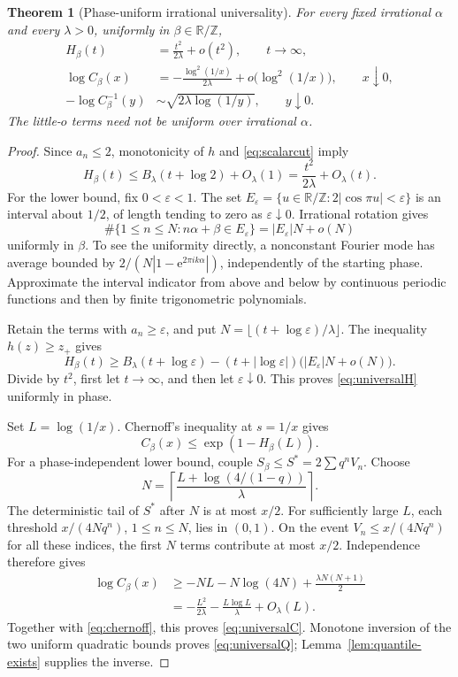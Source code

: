 \documentclass[11pt,a4paper]{article}
\newtheorem{theorem}{Theorem}[section]
\theoremstyle{definition}
\theoremstyle{remark}\newtheorem{remark}[theorem]{Remark}
\newcommand{\T}{\mathbb R/\mathbb Z}
\newcommand{\e}{\mathrm e}
\newcommand{\eps}{\varepsilon}
\begin{document}
\begin{theorem}[Phase-uniform irrational universality]
\label{thm:universal}
For every fixed irrational $\alpha$ and every $\lambda>0$, uniformly in
$\beta\in\T$,
\begin{align}
 H_\beta(t)&=\frac{t^2}{2\lambda}+o(t^2),\qquad t\to\infty,
 \label{eq:universalH}\\
 \log C_\beta(x)&=-\frac{\log^2(1/x)}{2\lambda}
                  +o\!\bigl(\log^2(1/x)\bigr),\qquad x\downarrow0,
 \label{eq:universalC}\\
 -\log C_\beta^{-1}(y)&\sim\sqrt{2\lambda\log(1/y)},\qquad y\downarrow0.
 \label{eq:universalQ}
\end{align}
The little-$o$ terms need not be uniform over irrational $\alpha$.
\end{theorem}
\begin{proof}
Since $a_n\le2$, monotonicity of $h$ and \eqref{eq:scalarcut} imply
\[
 H_\beta(t)\le B_\lambda(t+\log2)+O_\lambda(1)
             =\frac{t^2}{2\lambda}+O_\lambda(t).
\]
For the lower bound, fix $0<\eps<1$.  The set
$E_\eps=\{u\in\T:2|\cos\pi u|<\eps\}$ is an interval about $1/2$,
of length tending to zero as $\eps\downarrow0$.  Irrational rotation gives
\begin{equation}
 \#\{1\le n\le N:n\alpha+\beta\in E_\eps\}
 =|E_\eps|N+o(N)
 \label{eq:uniformequi}
\end{equation}
uniformly in $\beta$.  To see the uniformity directly, a nonconstant Fourier
mode has average bounded by
$2/(N|1-\e^{2\pi i k\alpha}|)$, independently of the starting phase.
Approximate the interval indicator from above and below by continuous
periodic functions and then by finite trigonometric polynomials.

Retain the terms with $a_n\ge\eps$, and put
$N=\lfloor(t+\log\eps)/\lambda\rfloor$.  The inequality $h(z)\ge z_+$
gives
\[
 H_\beta(t)\ge B_\lambda(t+\log\eps)
  -(t+|\log\eps|)\bigl(|E_\eps|N+o(N)\bigr).
\]
Divide by $t^2$, first let $t\to\infty$, and then let $\eps\downarrow0$.
This proves \eqref{eq:universalH} uniformly in phase.

Set $L=\log(1/x)$.  Chernoff's inequality at $s=1/x$ gives
\begin{equation}
 C_\beta(x)\le\exp(1-H_\beta(L)).
 \label{eq:chernoff}
\end{equation}
For a phase-independent lower bound, couple
$S_\beta\le S^*=2\sum q^nV_n$.  Choose
\[
 N=\left\lceil\frac{L+\log(4/(1-q))}{\lambda}\right\rceil.
\]
The deterministic tail of $S^*$ after $N$ is at most $x/2$.
For sufficiently large $L$, each threshold $x/(4Nq^n)$, $1\le n\le N$,
lies in $(0,1)$.  On the event $V_n\le x/(4Nq^n)$ for all these indices,
the first $N$ terms contribute at most $x/2$.  Independence therefore gives
\begin{align*}
 \log C_\beta(x)
 &\ge -NL-N\log(4N)+\frac{\lambda N(N+1)}2\\
 &=-\frac{L^2}{2\lambda}-\frac{L\log L}{\lambda}+O_\lambda(L).
\end{align*}
Together with \eqref{eq:chernoff}, this proves \eqref{eq:universalC}.
Monotone inversion of the two uniform quadratic bounds proves
\eqref{eq:universalQ}; Lemma~\ref{lem:quantile-exists} supplies the inverse.
\end{proof}
\end{document}
